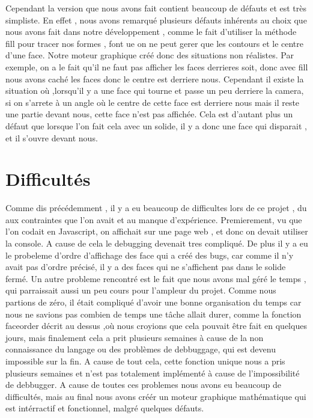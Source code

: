 Cependant la version que nous avons fait contient beaucoup de défauts et est très simpliste. En effet , nous avons remarqué plusieurs défauts inhérents au choix que nous avons fait dans notre développement , comme le fait d'utiliser la méthode fill pour tracer nos formes , font ue on ne peut gerer que les contours et le centre d'une face. Notre moteur graphique créé donc des situations non réalistes. Par exemple, on a le fait qu'il ne faut pas afficher les faces derrieres soit, donc avec fill nous avons caché les faces donc le centre est derriere nous. Cependant il existe la situation où ,lorsqu'il y a une face qui tourne et passe un peu derriere la camera, si on s'arrete à un angle où le centre de cette face est derriere nous mais il reste une partie devant nous, cette face n'est pas affichée. Cela est d'autant plus un défaut que lorsque l'on fait cela avec un solide, il y a donc une face qui disparait , et il s'ouvre devant nous.

\section{Difficultés}
Comme dis précédemment , il y a eu beaucoup de difficultes lors de ce projet , du aux contraintes que l'on avait et au manque d'expérience. Premierement, vu que l'on codait en Javascript, on affichait sur une page web , et donc on devait utiliser la console. A cause de cela le debugging devenait tres compliqué.
De plus il y a eu le probeleme d'ordre d'affichage des face qui a créé des bugs, car comme il n'y avait pas d'ordre précisé, il y a des faces qui ne s'affichent pas dans le solide fermé.
Un autre probleme rencontré est le fait  que nous avons mal géré le temps , qui parraissait aussi un peu cours pour l'ampleur du projet. Comme nous partions de zéro, il était compliqué d'avoir une bonne organisation du temps car nous ne savions pas combien de temps une tâche allait durer, comme la fonction faceorder décrit au dessus ,où nous croyions que cela pouvait être  
fait en quelques jours, mais finalement cela a prit plusieurs semaines à cause de la non connaissance du langage ou des problèmes de debbuggage, qui est devenu impossible sur la fin. A cause de tout cela, cette fonction unique nous a pris plusieurs semaines et n'est pas totalement implémenté à cause de l'impossibilité de debbugger.
A cause de toutes ces problemes nous avons eu beaucoup de difficultés, mais au final nous avons créér un moteur graphique mathématique qui est intérractif et fonctionnel, malgré quelques défauts.

